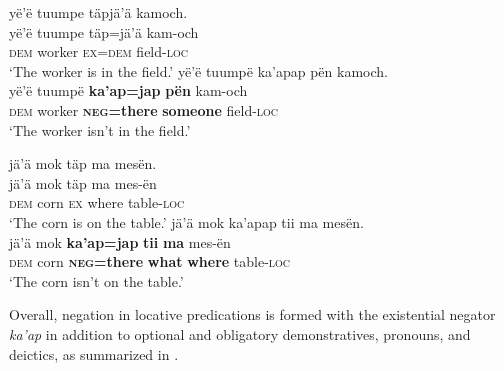 \documentclass[output=paper,colorlinks,citecolor=brown,draft]{langscibook}
\begin{document}
\ea\label{ex:mix:70}
    \ea\label{ex:mix:70a}
        \glll yë’ë tuumpe täpjä’ä kamoch. \\ 
              yë’ë tuumpe täp=jä’ä kam-och\\
              \textsc{dem} worker \textsc{ex}=\textsc{dem} field-\textsc{loc} \\
        \glt ‘The worker is in the field.’
    \ex\label{ex:mix:70b}
        \glll yë’ë tuumpë ka’apap pën kamoch. \\
             yë’ë tuumpë \textbf{ka’ap=jap} \textbf{pën} kam-och \\
             \textsc{dem} worker \textbf{\textsc{neg=}}\textbf{there} \textbf{someone} field-\textsc{loc}\\
        \glt ‘The worker isn’t in the field.’
    \z
\z 
 
\ea\label{ex:mix:71}
    \ea\label{ex:mix:71a}
        \glll jä’ä mok täp ma mesën.\\ 
              jä’ä mok täp ma mes-ën\\
              \textsc{dem} corn \textsc{ex} where table-\textsc{loc}\\
        \glt ‘The corn is on the table.’    
    \ex\label{ex:mix:71b}
        \glll jä’ä mok ka’apap tii ma mesën.\\
             jä’ä mok \textbf{ka’ap=jap} \textbf{tii} \textbf{ma} mes-ën\\
             \textsc{dem} corn \textbf{\textsc{neg=}}\textbf{there} \textbf{what} \textbf{where} table-\textsc{loc} \\
        \glt ‘The corn isn’t on the table.’
    \z
\z  

Overall, negation in locative predications is formed with the existential negator \textit{ka’ap} in addition to optional and obligatory demonstratives, pronouns, and deictics, as summarized in . %
\end{document}
